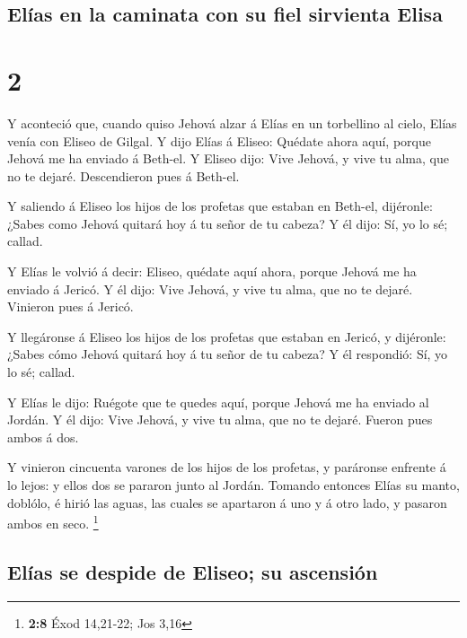 \hypertarget{eluxedas-en-la-caminata-con-su-fiel-sirvienta-elisa}{%
\subsection{Elías en la caminata con su fiel sirvienta
Elisa}\label{eluxedas-en-la-caminata-con-su-fiel-sirvienta-elisa}}

\hypertarget{section-1}{%
\section{2}\label{section-1}}

 Y aconteció que, cuando quiso Jehová alzar á Elías en un
torbellino al cielo, Elías venía con Eliseo de Gilgal.  Y
dijo Elías á Eliseo: Quédate ahora aquí, porque Jehová me ha enviado á
Beth-el. Y Eliseo dijo: Vive Jehová, y vive tu alma, que no te dejaré.
Descendieron pues á Beth-el.

 Y saliendo á Eliseo los hijos de los profetas que estaban
en Beth-el, dijéronle: ¿Sabes como Jehová quitará hoy á tu señor de tu
cabeza? Y él dijo: Sí, yo lo sé; callad.

 Y Elías le volvió á decir: Eliseo, quédate aquí ahora,
porque Jehová me ha enviado á Jericó. Y él dijo: Vive Jehová, y vive tu
alma, que no te dejaré. Vinieron pues á Jericó.

 Y llegáronse á Eliseo los hijos de los profetas que estaban
en Jericó, y dijéronle: ¿Sabes cómo Jehová quitará hoy á tu señor de tu
cabeza? Y él respondió: Sí, yo lo sé; callad.

 Y Elías le dijo: Ruégote que te quedes aquí, porque Jehová
me ha enviado al Jordán. Y él dijo: Vive Jehová, y vive tu alma, que no
te dejaré. Fueron pues ambos á dos.

 Y vinieron cincuenta varones de los hijos de los profetas,
y paráronse enfrente á lo lejos: y ellos dos se pararon junto al Jordán.
 Tomando entonces Elías su manto, doblólo, é hirió las
aguas, las cuales se apartaron á uno y á otro lado, y pasaron ambos en
seco. \footnote{\textbf{2:8} Éxod 14,21-22; Jos 3,16}

\hypertarget{eluxedas-se-despide-de-eliseo-su-ascensiuxf3n}{%
\subsection{Elías se despide de Eliseo; su
ascensión}\label{eluxedas-se-despide-de-eliseo-su-ascensiuxf3n}}

